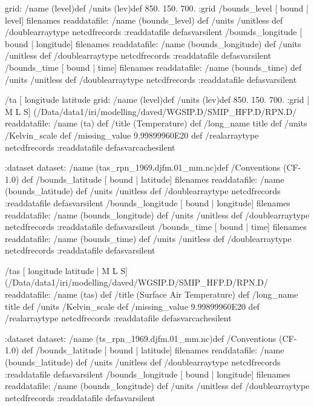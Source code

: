 grid:
/name (level)def
/units (lev)def
 850. 150. 700.
:grid
 /bounds_level{
[ bound | level] filenames readdatafile:
/name (bounds_level) def
 /units /unitless def
 /doublearraytype netcdfrecords :readdatafile
}defasvarsilent
 /bounds_longitude{
[ bound | longitude] filenames readdatafile:
/name (bounds_longitude) def
 /units /unitless def
 /doublearraytype netcdfrecords :readdatafile
}defasvarsilent
 /bounds_time{
[ bound | time] filenames readdatafile:
/name (bounds_time) def
 /units /unitless def
 /doublearraytype netcdfrecords :readdatafile
}defasvarsilent
\begin{ingrid}
 /ta{
[ longitude latitude 
grid:
/name (level)def
/units (lev)def
 850. 150. 700.
:grid
| M L S]
(/Data/data1/iri/modelling/daved/WGSIP.D/SMIP_HFP.D/RPN.D/%
readdatafile:
/name (ta) def
 /title (Temperature) def
/long_name title def
 /units /Kelvin_scale def
 /missing_value 9.99899960E20 def
 /realarraytype netcdfrecords :readdatafile
}defasvarcachesilent
\end{ingrid}
:dataset
dataset:
/name (tas_rpn_1969.djfm.01_mm.nc)def
 /Conventions (CF-1.0) def
 /bounds_latitude{
[ bound | latitude] filenames readdatafile:
/name (bounds_latitude) def
 /units /unitless def
 /doublearraytype netcdfrecords :readdatafile
}defasvarsilent
 /bounds_longitude{
[ bound | longitude] filenames readdatafile:
/name (bounds_longitude) def
 /units /unitless def
 /doublearraytype netcdfrecords :readdatafile
}defasvarsilent
 /bounds_time{
[ bound | time] filenames readdatafile:
/name (bounds_time) def
 /units /unitless def
 /doublearraytype netcdfrecords :readdatafile
}defasvarsilent
\begin{ingrid}
 /tas{
[ longitude latitude | M L S]
(/Data/data1/iri/modelling/daved/WGSIP.D/SMIP_HFP.D/RPN.D/%
readdatafile:
/name (tas) def
 /title (Surface Air Temperature) def
/long_name title def
 /units /Kelvin_scale def
 /missing_value 9.99899960E20 def
 /realarraytype netcdfrecords :readdatafile
}defasvarcachesilent
\end{ingrid}
:dataset
dataset:
/name (ts_rpn_1969.djfm.01_mm.nc)def
 /Conventions (CF-1.0) def
 /bounds_latitude{
[ bound | latitude] filenames readdatafile:
/name (bounds_latitude) def
 /units /unitless def
 /doublearraytype netcdfrecords :readdatafile
}defasvarsilent
 /bounds_longitude{
[ bound | longitude] filenames readdatafile:
/name (bounds_longitude) def
 /units /unitless def
 /doublearraytype netcdfrecords :readdatafile
}defasvarsilent
